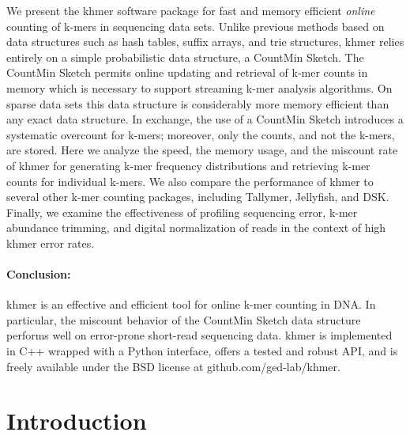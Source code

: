 \documentclass{article}
\begin{document}
We present the khmer software package for fast and memory efficient
{\em online} counting of k-mers in sequencing
data sets. Unlike previous methods based on data structures such as
hash tables, suffix arrays, and trie structures, khmer relies entirely
on a simple probabilistic data structure, a CountMin Sketch.  The
CountMin Sketch permits online updating and retrieval of k-mer counts
in memory which is necessary to support streaming k-mer analysis algorithms.
On sparse data sets this data structure is considerably more memory
efficient than any exact data structure.  In exchange, the use of a
CountMin Sketch introduces a systematic overcount for k-mers;
moreover, only the counts, and not the k-mers, are stored.
Here we analyze the speed, the memory usage, and the miscount rate of khmer
for generating k-mer frequency distributions and retrieving k-mer
counts for individual k-mers.  We also compare the performance of
khmer to several other k-mer counting packages, including Tallymer,
Jellyfish, and DSK.  Finally, we examine the effectiveness of profiling sequencing error, k-mer abundance trimming, and
digital normalization of reads in the context of high khmer error
rates.




\paragraph{Conclusion:}

khmer is an effective and
efficient tool for online k-mer counting in DNA.  In
particular, the miscount behavior of the CountMin Sketch data structure performs well
on error-prone short-read sequencing data.  khmer is implemented in C++ wrapped with a Python
interface, offers a tested and robust API, and is freely available
under the BSD license at github.com/ged-lab/khmer.

\section{Introduction}
\end{document}
